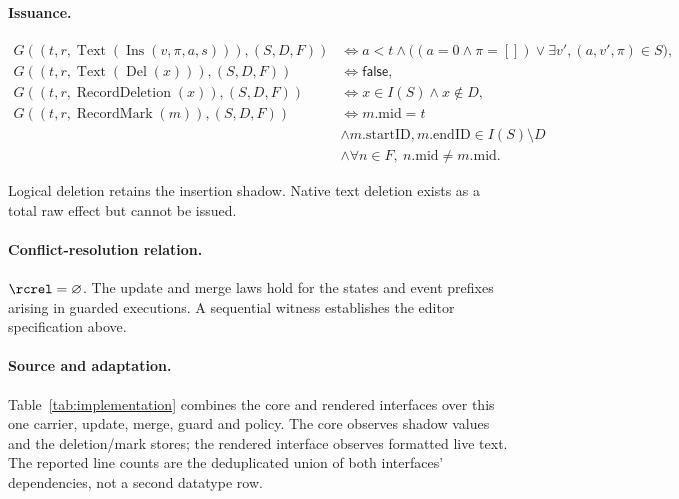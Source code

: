 \paragraph{Issuance.}
\[
\begin{aligned}G((t,r,\operatorname{Text}(\operatorname{Ins}(v,\pi,a,s))),(S,D,F))&\iff a<t\land\big((a=0\land\pi=[])\lor\exists v',(a,v',\pi)\in S\big),\\G((t,r,\operatorname{Text}(\operatorname{Del}(x))),(S,D,F))&\iff\mathsf{false},\\G((t,r,\operatorname{RecordDeletion}(x)),(S,D,F))&\iff x\in I(S)\land x\notin D,\\G((t,r,\operatorname{RecordMark}(m)),(S,D,F))&\iff m.\mathrm{mid}=t\\&\land m.\mathrm{startID},m.\mathrm{endID}\in I(S)\setminus D\\&\land\forall n\in F,\ n.\mathrm{mid}\ne m.\mathrm{mid}.\end{aligned}
\]


Logical deletion retains the insertion shadow. Native text deletion exists as a total raw effect but cannot be issued.


\paragraph{Conflict-resolution relation.}
$\rcrel=\varnothing$. The update and merge laws hold for the states and event prefixes arising in guarded executions. A sequential witness establishes the editor specification above.


\paragraph{Source and adaptation.}
Table~\ref{tab:implementation} combines the core and rendered interfaces
over this one carrier, update, merge, guard and policy. The core observes
shadow values and the deletion/mark stores; the rendered interface observes
formatted live text. The reported line counts are the deduplicated union of
both interfaces' dependencies, not a second datatype row.

